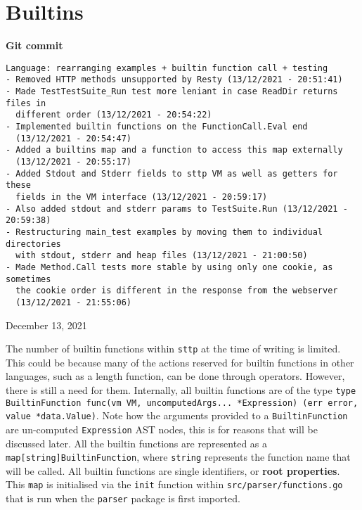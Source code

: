 \section{Builtins}
\label{sec:development-builtins}

\begin{center}
    \textbf{Git commit}
    \begin{verbatim}
Language: rearranging examples + builtin function call + testing
- Removed HTTP methods unsupported by Resty (13/12/2021 - 20:51:41)
- Made TestTestSuite_Run test more leniant in case ReadDir returns files in
  different order (13/12/2021 - 20:54:22)
- Implemented builtin functions on the FunctionCall.Eval end
  (13/12/2021 - 20:54:47)
- Added a builtins map and a function to access this map externally
  (13/12/2021 - 20:55:17)
- Added Stdout and Stderr fields to sttp VM as well as getters for these
  fields in the VM interface (13/12/2021 - 20:59:17)
- Also added stdout and stderr params to TestSuite.Run (13/12/2021 - 20:59:38)
- Restructuring main_test examples by moving them to individual directories
  with stdout, stderr and heap files (13/12/2021 - 21:00:50)
- Made Method.Call tests more stable by using only one cookie, as sometimes
  the cookie order is different in the response from the webserver
  (13/12/2021 - 21:55:06)
    \end{verbatim}
    \vspace{-1em}
    \tiny{December 13, 2021}
\end{center}

The number of builtin functions within \verb|sttp| at the time of writing is limited. This could be because many of the actions reserved for builtin functions in other languages, such as a length function, can be done through operators. However, there is still a need for them. Internally, all builtin functions are of the type \texttt{type BuiltinFunction func(vm VM, uncomputedArgs... *Expression) (err error, value *data.Value)}. Note how the arguments provided to a \verb|BuiltinFunction| are un-computed \verb|Expression| AST nodes, this is for reasons that will be discussed later. All the builtin functions are represented as a \texttt{map[string]BuiltinFunction}, where \texttt{string} represents the function name that will be called. All builtin functions are single identifiers, or \textbf{root properties}. This \texttt{map} is initialised via the \verb|init| function within \verb|src/parser/functions.go| that is run when the \verb|parser| package is first imported.

